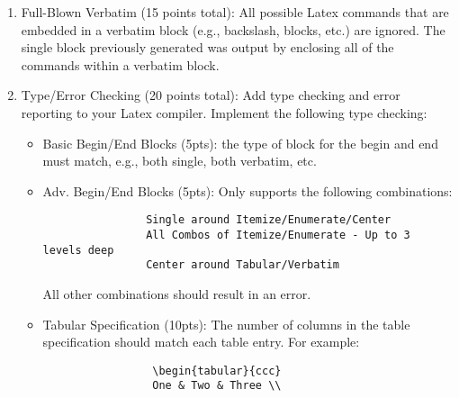 \begin{enumerate}
\begin{small}
\begin{verbatim}
      \begin{itemize}
      \item One item
      \item Another item
      \end{itemize}
      Here is some more text - does this work?
      \end{single}
      \end{verbatim}
      \end{small}
      To support this capability, you must carefully alter the grammar
      production rules.  We recommend doing this last, since it will likely
      cause problems and the other parts can be designed, implemented,
      and tested, without this extension.
\item Full-Blown Verbatim (15 points total): All possible Latex commands that are 
      embedded in a verbatim block (e.g., backslash, blocks, etc.) are ignored.
      The single block previously generated was output by enclosing all
      of the commands within a verbatim block.
\item Type/Error Checking (20 points total): Add type checking and error reporting to
      your Latex compiler.  Implement the following type checking:
      \begin{itemize}
      \item Basic Begin/End Blocks (5pts): the type of block for the begin
            and end must match, e.g.,  both single, both verbatim, etc.
      \item Adv. Begin/End Blocks (5pts): Only supports the following combinations:
            \begin{small}
            \begin{verbatim}
                Single around Itemize/Enumerate/Center
                All Combos of Itemize/Enumerate - Up to 3 levels deep
                Center around Tabular/Verbatim
            \end{verbatim}
            \end{small}
            All other combinations should result in an error.
      \item Tabular Specification (10pts):  The number of columns in the table
            specification should match each table entry.  For example:
            \begin{small}
            \begin{verbatim}
                 \begin{tabular}{ccc} 
                 One & Two & Three \\

\end{verbatim}
\end{small}
\end{itemize}
\end{enumerate}
